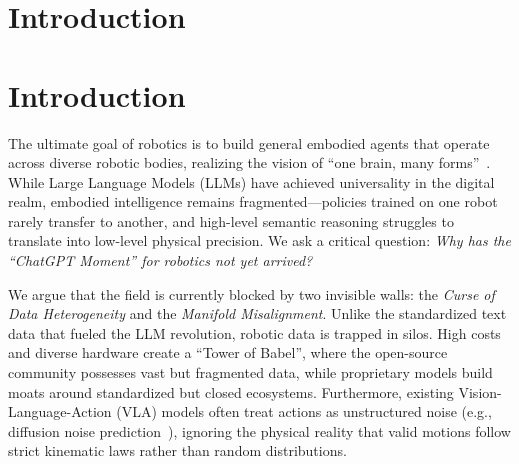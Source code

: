 \section{Introduction}
\label{sec:intro}

\section{Introduction}

The ultimate goal of robotics is to build general embodied agents that operate across diverse robotic bodies, realizing the vision of ``one brain, many forms''~\cite{rt2,liu2026rdt2,cheang2025gr}. While Large Language Models (LLMs) have achieved universality in the digital realm, embodied intelligence remains fragmented—policies trained on one robot rarely transfer to another, and high-level semantic reasoning struggles to translate into low-level physical precision. We ask a critical question: \textit{Why has the ``ChatGPT Moment'' for robotics not yet arrived?}

We argue that the field is currently blocked by two invisible walls: the \textit{Curse of Data Heterogeneity} and the \textit{Manifold Misalignment}. Unlike the standardized text data that fueled the LLM revolution, robotic data is trapped in silos. High costs and diverse hardware create a ``Tower of Babel'', where the open-source community possesses vast but fragmented data, while proprietary models build moats around standardized but closed ecosystems. Furthermore, existing Vision-Language-Action (VLA) models often treat actions as unstructured noise (e.g., diffusion noise prediction~\cite{GR00T}), ignoring the physical reality that valid motions follow strict kinematic laws rather than random distributions.

